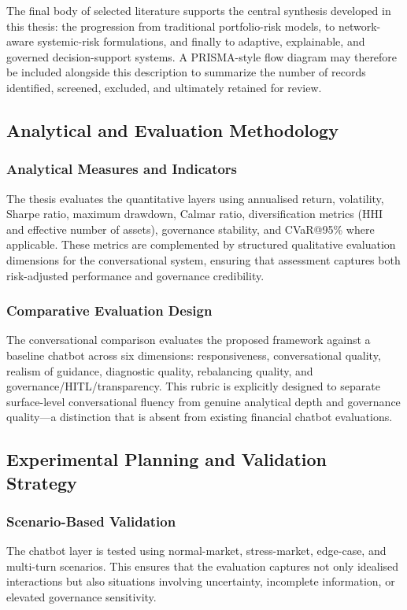 \documentclass[11pt]{article}
\begin{document}
The final body of selected literature supports the central synthesis developed in this thesis: the progression from traditional portfolio-risk models, to network-aware systemic-risk formulations, and finally to adaptive, explainable, and governed decision-support systems. A PRISMA-style flow diagram may therefore be included alongside this description to summarize the number of records identified, screened, excluded, and ultimately retained for review.

\subsection{Analytical and Evaluation Methodology}
\subsubsection{Analytical Measures and Indicators}
The thesis evaluates the quantitative layers using annualised return, volatility, Sharpe ratio, maximum drawdown, Calmar ratio, diversification metrics (HHI and effective number of assets), governance stability, and CVaR@95\% where applicable. These metrics are complemented by structured qualitative evaluation dimensions for the conversational system, ensuring that assessment captures both risk-adjusted performance and governance credibility.

\subsubsection{Comparative Evaluation Design}
The conversational comparison evaluates the proposed framework against a baseline chatbot across six dimensions: responsiveness, conversational quality, realism of guidance, diagnostic quality, rebalancing quality, and governance/HITL/transparency. This rubric is explicitly designed to separate surface-level conversational fluency from genuine analytical depth and governance quality---a distinction that is absent from existing financial chatbot evaluations.

\subsection{Experimental Planning and Validation Strategy}
\subsubsection{Scenario-Based Validation}
The chatbot layer is tested using normal-market, stress-market, edge-case, and multi-turn scenarios. This ensures that the evaluation captures not only idealised interactions but also situations involving uncertainty, incomplete information, or elevated governance sensitivity.
\end{document}
